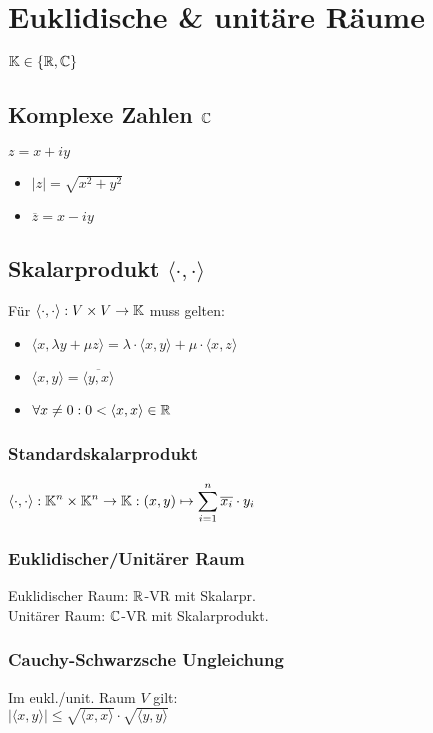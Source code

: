 \section*{Euklidische \& unitäre Räume}
$\mathbb{K}\in\{\mathbb{R},\mathbb{C}\}$

\subsection*{Komplexe Zahlen $\mathbb{C}$}
$z=x+iy$
\begin{itemize}
	\item $|z| = \sqrt{x^2 + y^2}$
	\item $\overline{z} = x - iy$
\end{itemize}

\subsection*{Skalarprodukt $\langle\cdot,\cdot\rangle$}
Für $\langle\cdot,\cdot\rangle: V \times V \to \mathbb{K}$ muss gelten:
\begin{itemize}
	\item $\langle x,\lambda y + \mu z \rangle = \lambda\cdot\langle x,y\rangle + \mu\cdot\langle x,z\rangle$
	\item $\langle x,y \rangle = \overline{\langle y,x \rangle}$
	\item $\forall x\neq 0: 0 < \langle x,x \rangle \in \mathbb{R}$
\end{itemize}

\subsubsection*{Standardskalarprodukt}
$\displaystyle \langle\cdot,\cdot\rangle: \mathbb{K}^n \times \mathbb{K}^n \to \mathbb{K}: (x,y)\mapsto \sum_{i=1}^n \overline{x_i}\cdot y_i$

\subsubsection*{Euklidischer/Unitärer Raum}
Euklidischer Raum: $\mathbb{R}$-VR mit Skalarpr. \\
Unitärer Raum: $\mathbb{C}$-VR mit Skalarprodukt.

\subsubsection*{Cauchy-Schwarzsche Ungleichung}
Im eukl./unit. Raum $V$ gilt: \\
$|\langle x,y\rangle| \le \sqrt{\langle x,x \rangle}\cdot\sqrt{\langle y,y \rangle}$

